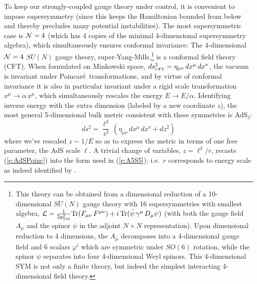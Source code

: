 \documentclass[12pt,a4paper]{article}
\def\req#1{(\ref{#1})}
\def\SYM{super-Yang-Mills}
\def\Poinc{Poincar\' e}
\def\gYM{g_{\scriptscriptstyle {\rm YM}}}
\def\Rads{\ell}
\def\ph{\varphi}
\begin{document}
To keep our strongly-coupled gauge theory under control, it is convenient to impose supersymmetry (since this keeps the Hamiltonian bounded from below and thereby precludes many potential instabilities).  The most supersymmetric case is ${\cal N}=4$ (which has 4 copies of the minimal 4-dimensional supersymmetry algebra), which simultaneously ensures conformal invariance:  The 4-dimensional  ${\cal N}=4$ $SU(N)$ gauge theory, \SYM,\footnote{
This theory can be obtained from a dimensional reduction of a 10-dimensional $SU(N)$ gauge theory with 16 supersymmetries with smallest algebra, 
$ {\cal L} = \frac{1}{2\gYM^2}  {\rm Tr} ( F_{\mu\nu} \, F^{\mu\nu}) + i \, {\rm Tr} ( {\bar \psi} \, \gamma^\mu \, D_\mu \psi )$ (with both the gauge field $A_\mu$ and the spinor $\psi$  in the adjoint $N\times N$ representation).  Upon dimensional reduction to 4 dimensions, the $A_\mu$ decomposes into a 4-dimensional gauge field and 6 scalars $\ph^i$ which are symmetric under $SO(6)$ rotation, while the spinor $\psi$ separates into four 4-dimensional Weyl spinors.
This 4-dimensional SYM is not only a finite theory, but indeed the simplest interacting 4-dimensional field theory.
} is a conformal field theory (CFT).  When formulated on Minkowski space, 
$ds_{\scriptscriptstyle {\rm CFT}}^2 = \eta_{\mu\nu} \, dx^\mu \, dx^\nu$,
the vacuum is invariant under \Poinc\ transformations, and by virtue of conformal invariance it is also in particular invariant under a rigid scale transformation $x^\mu \to \alpha \, x^\mu$, which simultaneously rescales the energy $E \to E/\alpha$.  Identifying inverse energy with the extra dimension (labeled by a new coordinate $z$), the most general 5-dimensional bulk metric consistent with these symmetries is AdS$_5$:
%
\begin{equation}
ds^2 = \frac{\Rads^2}{z^2} \, \left(  \eta_{\mu\nu} \, dx^\mu \, dx^\nu + dz^2 \right)
\label{e:AdSPoinc}
\end{equation}	
%
where we've rescaled $z \sim 1/E$  so as to express the metric in terms of one free parameter, the AdS scale $\Rads$.  A trivial change of variables, $z=\Rads^2/r$, recasts \req{e:AdSPoinc} into the  form used in \req{e:A5S5}; i.e.\ $r$ corresponds to energy scale as indeed identified by \cite{Maldacena:1997re}.
\end{document}
